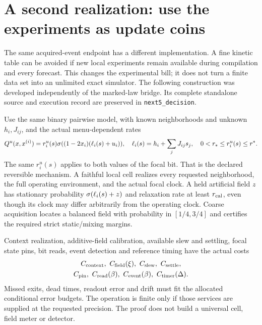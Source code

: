 \section{A second realization: use the experiments as update coins}
The same acquired-event endpoint has a different implementation. A fine
kinetic table can be avoided if new local experiments remain available
during compilation and every forecast. This changes the experimental
bill; it does not turn a finite data set into an unlimited exact simulator.
The following construction was developed independently of the
marked-law bridge. Its complete standalone source and execution record
are preserved in \texttt{next5\_decision}.

Use the same binary pairwise model, with known neighborhoods and unknown
$h_i,J_{ij}$, and the actual menu-dependent rates
\begin{equation}\label{eq:Q}
Q^u(x,x^{(i)})=r_i^u(s)\sigma((1-2x_i)(\ell_i(s)+u_i)),
\quad \ell_i(s)=h_i+\sum_jJ_{ij}s_j,
\quad 0<r_*\le r_i^u(s)\le r^*.
\end{equation}
The same $r_i^u(s)$ applies to both values of the focal bit. That is the
declared reversible mechanism. A faithful local cell realizes every
requested neighborhood, the full operating environment, and the actual
focal clock. A held artificial field $z$ has stationary probability
$\sigma(\ell_i(s)+z)$ and relaxation rate at least $r_{\rm cal}$, even
though its clock may differ arbitrarily from the operating clock.
Coarse acquisition locates a balanced field with probability in
$[1/4,3/4]$ and certifies the required strict static/mixing margins.

Context realization, additive-field calibration, available slew and
settling, focal state pins, bit reads, event detection and reference timing
have the actual costs
\[
\begin{gathered}
C_{\rm context},\ C_{\rm field}(\xi),\ C_{\rm slew},\ C_{\rm settle},\\
C_{\rm pin},\ C_{\rm read}(\beta),\ C_{\rm event}(\beta),\
C_{\rm timer}(\Delta).
\end{gathered}
\]
Missed exits, dead times, readout error and drift must fit the allocated
conditional error budgets. The operation is finite only if those
services are supplied at the requested precision. The proof does not
build a universal cell, field meter or detector.

